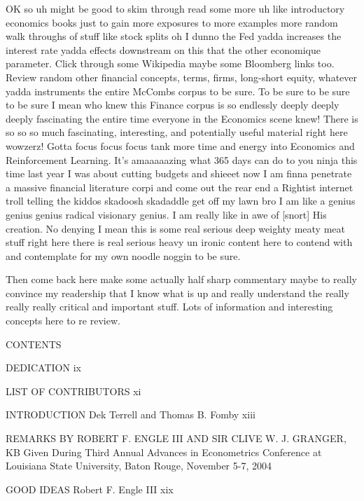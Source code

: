 OK so uh might be good to skim through read some more uh like introductory economics books just to gain more exposures to more examples more random walk throughs of stuff like stock splits oh I dunno the Fed yadda increases the interest rate yadda effects downstream on this that the other economique parameter. Click through some Wikipedia maybe some Bloomberg links too. Review random other financial concepts, terms, firms, long-short equity, whatever yadda instruments the entire McCombs corpus to be sure. To be sure to be sure to be sure I mean who knew this Finance corpus is so endlessly deeply deeply deeply fascinating the entire time everyone in the Economics scene knew! There is so so so much fascinating, interesting, and potentially useful material right here wowzerz! Gotta focus focus focus tank more time and energy into Economics and Reinforcement Learning. It's amaaaaazing what 365 days can do to you ninja this time last year I was about cutting budgets and shieeet now I am finna penetrate a massive financial literature corpi and come out the rear end a Rightist internet troll telling the kiddos skadoosh skadaddle get off my lawn bro I am like a genius genius genius radical visionary genius. I am really like in awe of [snort] His creation. No denying I mean this is some real serious deep weighty meaty meat stuff right here there is real serious heavy un ironic content here to contend with and contemplate for my own noodle noggin to be sure.

Then come back here make some actually half sharp commentary maybe to really convince my readership that I know what is up and really understand the really really really critical and important stuff. Lots of information and interesting concepts here to re review.

CONTENTS



DEDICATION ix



LIST OF CONTRIBUTORS xi



INTRODUCTION
Dek Terrell and Thomas B. Fomby xiii



REMARKS BY ROBERT F. ENGLE III AND
SIR CLIVE W. J. GRANGER, KB
Given During Third Annual Advances in Econometrics
Conference at Louisiana State University, Baton
Rouge, November 5-7, 2004



GOOD IDEAS
Robert F. Engle III xix



